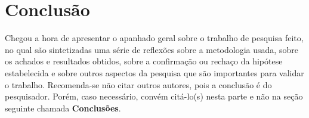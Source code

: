 \chapter{Conclusão}
\label{chap:conc}

Chegou a hora de apresentar o apanhado geral sobre o trabalho de
pesquisa feito, no qual s\~ao sintetizadas uma s\'erie de
reflex\~oes sobre a metodologia usada, sobre os achados e
resultados obtidos, sobre a confirma\c{c}\~ao ou recha\c{c}o da
hip\'otese estabelecida e sobre outros aspectos da pesquisa que
s\~ao importantes para validar o trabalho. Recomenda-se n\~ao
citar outros autores, pois a conclus\~ao \'e do pesquisador.
Por\'em, caso necess\'ario, conv\'em cit\'a-lo(s) nesta parte e
n\~ao na se\c{c}\~ao seguinte chamada \textbf{Conclus\~oes}.




